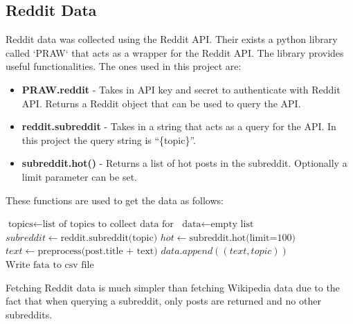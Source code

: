 \subsection{Reddit Data}
Reddit data was collected using the Reddit API. Their exists a python library called `PRAW` \cite{praw} that acts as a wrapper for the Reddit API.
The library provides useful functionalities. The ones used in this project are:
\begin{itemize}
    \item \textbf{PRAW.reddit} - Takes in API key and secret to authenticate with Reddit API. Returns a Reddit object that can be used to query the API.
    \item \textbf{reddit.subreddit} - Takes in a string that acts as a query for the API. In this project the query string is ``\{topic\}''.
    \item \textbf{subreddit.hot()} - Returns a list of hot posts in the subreddit. Optionally a limit parameter can be set.
\end{itemize}
These functions are used to get the data as follows:
\begin{algorithm}
    \begin{algorithmic}
        \STATE $\text{topics} \gets \text{list of topics to collect data for}$
        \STATE $\text{data} \gets \text{empty list}$
            \STATE $subreddit \gets \text{reddit.subreddit(topic)}$
            \STATE $hot \gets \text{subreddit.hot(limit=100)}$
                \STATE $text \gets \text{preprocess(post.title + text)}$
                \STATE $data.append((text, topic))$
            \ENDFOR
        \ENDFOR
        \STATE $\text{Write fata to csv file}$
    \end{algorithmic}
\end{algorithm}
Fetching Reddit data is much simpler than fetching Wikipedia data due to the fact that when querying a subreddit, only posts are returned and no other subreddits.
